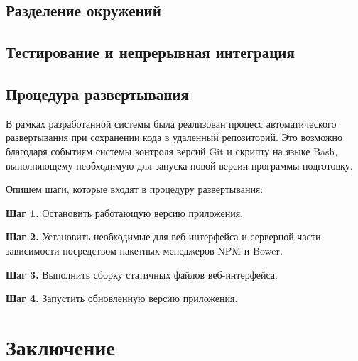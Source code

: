 \documentclass[a4paper,14pt,href,draft]{article}
\begin{document}

\subsection{Разделение окружений}

\subsection{Тестирование и непрерывная интеграция}

\subsection{Процедура развертывания}
В рамках разработанной системы была реализован процесс автоматического развертывания при сохранении кода в удаленный
репозиторий. Это возможно благодаря событиям системы контроля версий Git и скрипту на языке Bash, выполняющему необходимую
для запуска новой версии программы подготовку\cite{PushDeploy}.

Опишем шаги, которые входят в процедуру развертывания:
\begin{description}
  \item \textbf{Шаг 1.} Остановить работающую версию приложения.
  \item \textbf{Шаг 2.} Установить необходимые для веб-интерфейса и серверной части зависимости посредством пакетных
    менеджеров NPM и Bower.
  \item \textbf{Шаг 3.} Выполнить сборку статичных файлов веб-интерфейса.
  \item \textbf{Шаг 4.} Запустить обновленную версию приложения.
\end{description}

\newpage
\section*{Заключение}


\newpage
{}



\end{document}
